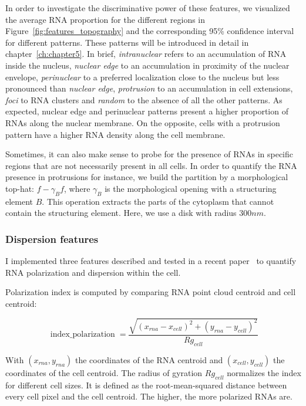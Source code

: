 In order to investigate the discriminative power of these features, we visualized the average \ac{RNA} proportion for the different regions in Figure~\ref{fig:features_topography} and the corresponding 95\% confidence interval for different patterns.
These patterns will be introduced in detail in chapter~\ref{ch:chapter5}.
In brief, \emph{intranuclear} refers to an accumulation of \ac{RNA} inside the nucleus, \emph{nuclear edge} to an accumulation in proximity of the nuclear envelope, \emph{perinuclear} to a preferred localization close to the nucleus but less pronounced than \emph{nuclear edge}, \emph{protrusion} to an accumulation in cell extensions, \emph{foci} to \ac{RNA} clusters and \emph{random} to the absence of all the other patterns.
As expected, nuclear edge and perinuclear patterns present a higher proportion of \ac{RNA}s along the nuclear membrane.
On the opposite, cells with a protrusion pattern have a higher \ac{RNA} density along the cell membrane.

Sometimes, it can also make sense to probe for the presence of \ac{RNA}s in specific regions that are not necessarily present in all cells.
In order to quantify the \ac{RNA} presence in protrusions for instance, we build the partition by a morphological top-hat: $f-\gamma_B f$, where $\gamma_B$ is the morphological opening with a structuring element $B$.
This operation extracts the parts of the cytoplasm that cannot contain the structuring element.
Here, we use a disk with radius $300 nm$.

\subsubsection{Dispersion features}

I implemented three features described and tested in a recent paper~\cite{stueland_rdi_2019} to quantify \ac{RNA} polarization and dispersion within the cell.

Polarization index is computed by comparing \ac{RNA} point cloud centroid and cell centroid:

\begin{equation}
	{\displaystyle \operatorname{index\_polarization} = \frac{\sqrt{(x_{rna} - x_{cell})^2 + (y_{rna} - y_{cell})^2}}{Rg_{cell}}}
\end{equation}

\noindent
With $(x_{rna}, y_{rna})$ the coordinates of the \ac{RNA} centroid and $(x_{cell}, y_{cell})$ the coordinates of the cell centroid.
The radius of gyration $Rg_{cell}$ normalizes the index for different cell sizes.
It is defined as the root-mean-squared distance between every cell pixel and the cell centroid.
The higher, the more polarized \ac{RNA}s are.

